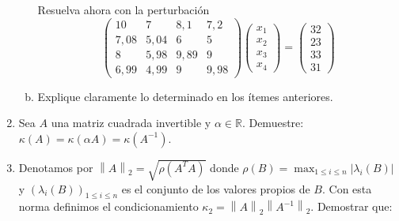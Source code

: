\documentclass[
	spanish,
	9pt,
	utf8,
	xcolor=table,
	handout,
	aspectratio=1610,
	professionalfonts,
	notheorems,
	mathserif,
]{beamer}
\begin{document}
\begin{frame}
\begin{enumerate}
\begin{enumerate}[a)]
			            Resuelva ahora con la perturbación
			            \begin{equation*}
				            \begin{pmatrix}
					            10   & 7    & 8,1  & 7,2  \\
					            7,08 & 5,04 & 6    & 5    \\
					            8    & 5,98 & 9,89 & 9    \\
					            6,99 & 4,99 & 9    & 9,98
				            \end{pmatrix}
				            \begin{pmatrix}
					            x_{1} \\
					            x_{2} \\
					            x_{3} \\
					            x_{4}
				            \end{pmatrix}=
				            \begin{pmatrix}
					            32 \\
					            23 \\
					            33 \\
					            31
				            \end{pmatrix}
			            \end{equation*}

			      \item

			            Explique claramente lo determinado en los ítemes anteriores.
		      \end{enumerate}

		\item

		      Sea $A$ una matriz cuadrada invertible y $\alpha\in\mathbb{R}$.
		      Demuestre:
		      \begin{math}
			      \kappa\left(A\right)=
			      \kappa\left(\alpha A\right)=
			      \kappa\left(A^{-1}\right)
		      \end{math}.

		\item
		      Denotamos por
		      \begin{math}
			      {\left\|A\right\|}_{2}=
			      \sqrt{\rho\left(A^{T}A\right)}
		      \end{math}
		      donde
		      \begin{math}
			      \rho\left(B\right)=
			      \max_{1\leq i\leq n}
			      \left|\lambda_{i}\left(B\right)\right|
		      \end{math}
		      y
		      \begin{math}
			      {\left(
				      \lambda_{i}\left(B\right)
				      \right)}_{
				      1\leq i\leq n
			      }
		      \end{math}
		      es el conjunto de los valores propios de $B$.
		      Con esta norma definimos el condicionamiento
		      \begin{math}
			      \kappa_{2}=
			      {\left\|A\right\|}_{2}{
			      \left\|A^{-1}\right\|
			      }_{2}
		      \end{math}.
		      Demostrar que:


\end{enumerate}
\end{frame}
\end{document}
